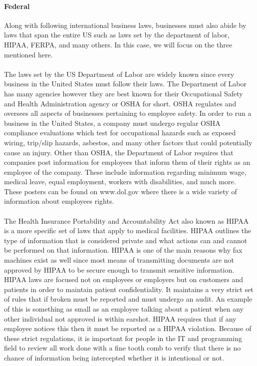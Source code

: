 \documentclass[notitlepage,a4paper,12pt]{article}
\begin{document}
\paragraph{Federal}Along with following international business laws, businesses must also abide by laws that span the entire US such as laws set by the department of labor, HIPAA, FERPA, and many others. In this case, we will focus on the three mentioned here.
\paragraph{}The laws set by the US Department of Labor are widely known since every business in the United States must follow their laws. The Department of Labor has many agencies however they are best known for their Occupational Safety and Health Administration agency or OSHA for short. OSHA regulates and oversees all aspects of businesses pertaining to employee safety. In order to run a business in the United States, a company must undergo regular OSHA compliance evaluations which test for occupational hazards such as exposed wiring, trip/slip hazards, asbestos, and many other factors that could potentially cause an injury. Other than OSHA, the Department of Labor requires that companies post information for employees that inform them of their rights as an employee of the company. These include information regarding minimum wage, medical leave, equal employment, workers with disabilities, and much more. These posters can be found on www.dol.gov where there is a wide variety of information about employees rights.
\paragraph{}The Health Insurance Portability and Accountability Act also known as HIPAA is a more specific set of laws that apply to medical facilities. HIPAA outlines the type of information that is considered private and what actions can and cannot be performed on that information. HIPAA is one of the main reasons why fax machines exist as well since most means of transmitting documents are not approved by HIPAA to be secure enough to transmit sensitive information. HIPAA laws are focused not on employees or employers but on customers and patients in order to maintain patient confidentiality. It maintains a very strict set of rules that if broken must be reported and must undergo an audit. An example of this is something as small as an employee talking about a patient when any other individual not approved is within earshot. HIPAA requires that if any employee notices this then it must be reported as a HIPAA violation. Because of these strict regulations, it is important for people in the IT and programming field to review all work done with a fine tooth comb to verify that there is no chance of information being intercepted whether it is intentional or not.
\end{document}
